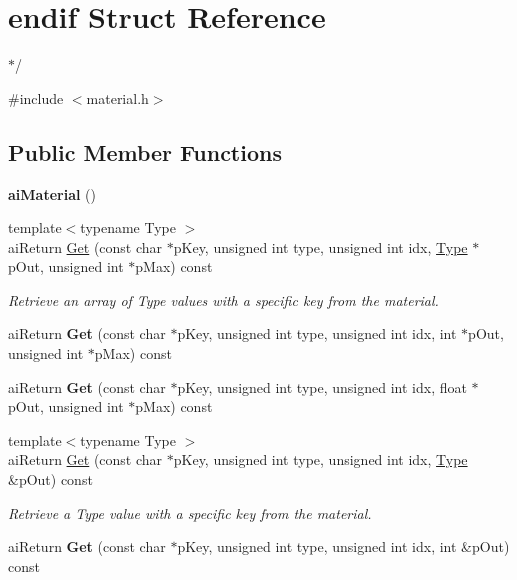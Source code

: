 \hypertarget{structendif}{}\section{endif Struct Reference}
\label{structendif}


$\ast$/  




{\ttfamily \#include $<$material.\+h$>$}

\subsection*{Public Member Functions}
\begin{DoxyCompactItemize}
\item 
{\bfseries ai\+Material} ()\hypertarget{structendif_aecfb322023b3a31eb28c53ddb5fe5cb3}{}\label{structendif_aecfb322023b3a31eb28c53ddb5fe5cb3}

\item 
{\footnotesize template$<$typename Type $>$ }\\ai\+Return \hyperlink{structendif_a4b08154b44a2676d0664547b6475aa0b}{Get} (const char $\ast$p\+Key, unsigned int type, unsigned int idx, \hyperlink{rapidjson_8h_a1d1cfd8ffb84e947f82999c682b666a7}{Type} $\ast$p\+Out, unsigned int $\ast$p\+Max) const 
\begin{DoxyCompactList}\small\item\em Retrieve an array of Type values with a specific key from the material. \end{DoxyCompactList}\item 
ai\+Return {\bfseries Get} (const char $\ast$p\+Key, unsigned int type, unsigned int idx, int $\ast$p\+Out, unsigned int $\ast$p\+Max) const \hypertarget{structendif_a5f7f7f17939445e46d4b627a94e6f3e8}{}\label{structendif_a5f7f7f17939445e46d4b627a94e6f3e8}

\item 
ai\+Return {\bfseries Get} (const char $\ast$p\+Key, unsigned int type, unsigned int idx, float $\ast$p\+Out, unsigned int $\ast$p\+Max) const \hypertarget{structendif_a3025cbc4b9b9ab1a2d576226c88b9580}{}\label{structendif_a3025cbc4b9b9ab1a2d576226c88b9580}

\item 
{\footnotesize template$<$typename Type $>$ }\\ai\+Return \hyperlink{structendif_aaa5e921648171c5d4a9f195030c17883}{Get} (const char $\ast$p\+Key, unsigned int type, unsigned int idx, \hyperlink{rapidjson_8h_a1d1cfd8ffb84e947f82999c682b666a7}{Type} \&p\+Out) const 
\begin{DoxyCompactList}\small\item\em Retrieve a Type value with a specific key from the material. \end{DoxyCompactList}\item 
ai\+Return {\bfseries Get} (const char $\ast$p\+Key, unsigned int type, unsigned int idx, int \&p\+Out) const \hypertarget{structendif_a178f108e6bd7afef988a043e70f29cdf}{}\label{structendif_a178f108e6bd7afef988a043e70f29cdf}


\end{DoxyCompactItemize}

